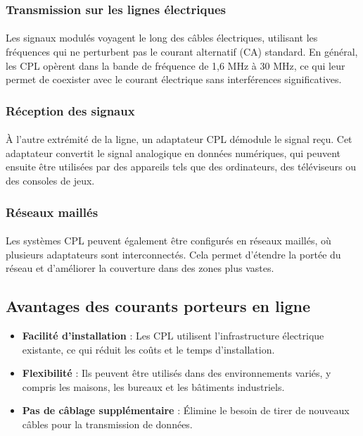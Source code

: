 \documentclass[a4paper,draft,twocolumn]{report}
\begin{document}
\subsubsection{Transmission sur les lignes électriques}
\paragraph{} Les signaux modulés voyagent le long des câbles électriques, utilisant les fréquences qui ne perturbent pas le courant alternatif (CA) standard. En général, les CPL opèrent dans la bande de fréquence de 1,6 MHz à 30 MHz, ce qui leur permet de coexister avec le courant électrique sans interférences significatives.

\subsubsection{Réception des signaux}
\paragraph{} À l'autre extrémité de la ligne, un adaptateur CPL démodule le signal reçu. Cet adaptateur convertit le signal analogique en données numériques, qui peuvent ensuite être utilisées par des appareils tels que des ordinateurs, des téléviseurs ou des consoles de jeux.

\subsubsection{Réseaux maillés}
\paragraph{} Les systèmes CPL peuvent également être configurés en réseaux maillés, où plusieurs adaptateurs sont interconnectés. Cela permet d'étendre la portée du réseau et d'améliorer la couverture dans des zones plus vastes.

\subsection{Avantages des courants porteurs en ligne}
\begin{itemize}
    \item \textbf{Facilité d'installation} : Les CPL utilisent l'infrastructure électrique existante, ce qui réduit les coûts et le temps d'installation.
    \item \textbf{Flexibilité} : Ils peuvent être utilisés dans des environnements variés, y compris les maisons, les bureaux et les bâtiments industriels.
    \item \textbf{Pas de câblage supplémentaire} : Élimine le besoin de tirer de nouveaux câbles pour la transmission de données.
\end{itemize}
\end{document}
